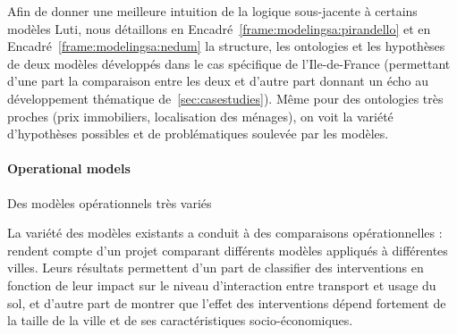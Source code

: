 \bpar{}
{
Afin de donner une meilleure intuition de la logique sous-jacente à certains modèles Luti, nous détaillons en Encadré~\ref{frame:modelingsa:pirandello} et en Encadré~\ref{frame:modelingsa:nedum} la structure, les ontologies et les hypothèses de deux modèles développés dans le cas spécifique de l'Ile-de-France (permettant d'une part la comparaison entre les deux et d'autre part donnant un écho au développement thématique de~\ref{sec:casestudies}). Même pour des ontologies très proches (prix immobiliers, localisation des ménages), on voit la variété d'hypothèses possibles et de problématiques soulevée par les modèles.
}






\paragraph{Operational models}{Des modèles opérationnels très variés}


{
La variété des modèles existants a conduit à des comparaisons opérationnelles : \cite{paulley1991overview} rendent compte d'un projet comparant différents modèles appliqués à différentes villes. Leurs résultats permettent d'un part de classifier des interventions en fonction de leur impact sur le niveau d'interaction entre transport et usage du sol, et d'autre part de montrer que l'effet des interventions dépend fortement de la taille de la ville et de ses caractéristiques socio-économiques.
}





